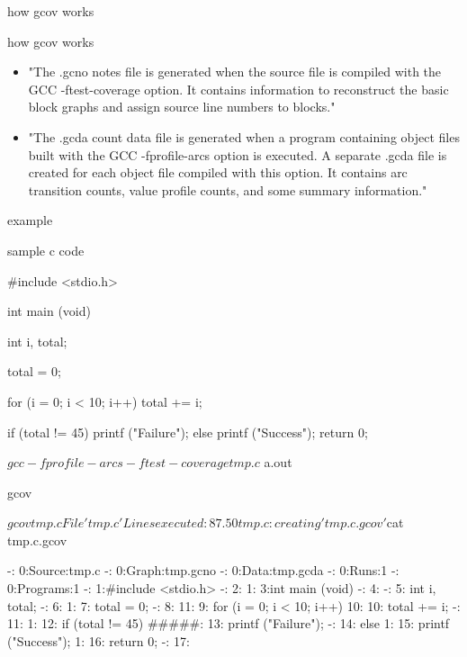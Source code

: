 \documentclass{beamer}
\begin{document}

\begin{frame}{how gcov works}

\begin{block}{how gcov works}
\small

\begin{itemize}
  \item "The .gcno notes file is generated when the source file is compiled with the GCC -ftest-coverage option. It contains information to reconstruct the basic block graphs and assign source line numbers to blocks."
  \item "The .gcda count data file is generated when a program containing object files built with the GCC -fprofile-arcs option is executed. A separate .gcda file is created for each object file compiled with this option. It contains arc transition counts, value profile counts, and some summary information."
\end{itemize}
\end{block}

\end{frame}


\begin{frame}{example}

\begin{block}{sample c code}
\small

#include <stdio.h>

int main (void)
{
  int i, total;

  total = 0;

  for (i = 0; i < 10; i++)
    total += i;

  if (total != 45)
    printf ("Failure\n");
  else
    printf ("Success\n");
  return 0;
}

$ gcc -fprofile-arcs -ftest-coverage tmp.c
$ a.out

gcov

$ gcov tmp.c
File 'tmp.c'
Lines executed:87.50%
tmp.c:creating 'tmp.c.gcov'


$cat tmp.c.gcov

        -:    0:Source:tmp.c
        -:    0:Graph:tmp.gcno
        -:    0:Data:tmp.gcda
        -:    0:Runs:1
        -:    0:Programs:1
        -:    1:#include <stdio.h>
        -:    2:
        1:    3:int main (void)
        -:    4:{
        -:    5:  int i, total;
        -:    6:
        1:    7:  total = 0;
        -:    8:
       11:    9:  for (i = 0; i < 10; i++)
       10:   10:    total += i;
        -:   11:
        1:   12:  if (total != 45)
    #####:   13:    printf ("Failure\n");
        -:   14:  else
        1:   15:    printf ("Success\n");
        1:   16:  return 0;
        -:   17:}
\end{block}

\end{frame}
\end{document}
